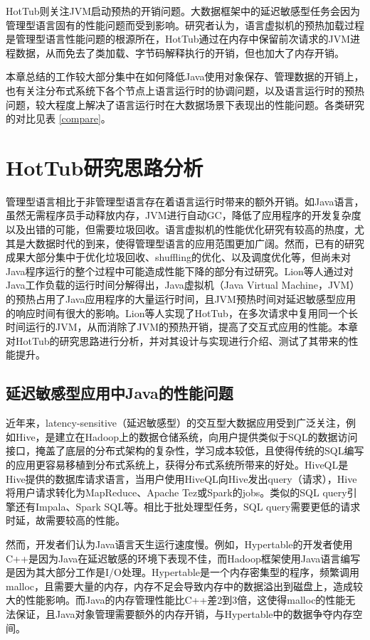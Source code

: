 \documentclass[lang=cn,12pt,a4paper,cite=authoryear]{elegantpaper}
\begin{document}

HotTub则关注JVM启动预热的开销问题。大数据框架中的延迟敏感型任务会因为管理型语言固有的性能问题而受到影响。研究者认为，语言虚拟机的预热加载过程是管理型语言性能问题的根源所在，HotTub通过在内存中保留前次请求的JVM进程数据，从而免去了类加载、字节码解释执行的开销，但也加大了内存开销。

本章总结的工作较大部分集中在如何降低Java使用对象保存、管理数据的开销上，也有关注分布式系统下各个节点上语言运行时的协调问题，以及语言运行时的预热问题，较大程度上解决了语言运行时在大数据场景下表现出的性能问题。各类研究的对比见表 \ref{compare}。

\section{HotTub研究思路分析}
管理型语言相比于非管理型语言存在着语言运行时带来的额外开销。如Java语言，虽然无需程序员手动释放内存，JVM进行自动GC，降低了应用程序的开发复杂度以及出错的可能，但需要垃圾回收。语言虚拟机的性能优化研究有较高的热度，尤其是大数据时代的到来，使得管理型语言的应用范围更加广阔。然而，已有的研究成果大部分集中于优化垃圾回收、shuffling的优化、以及调度优化等，但尚未对Java程序运行的整个过程中可能造成性能下降的部分有过研究。Lion等人通过对Java工作负载的运行时间分解得出，Java虚拟机（Java Virtual Machine，JVM）的预热占用了Java应用程序的大量运行时间，且JVM预热时间对延迟敏感型应用的响应时间有很大的影响。Lion等人实现了HotTub\cite{DBLP:conf/osdi/LionCSZGY16}，在多次请求中复用同一个长时间运行的JVM，从而消除了JVM的预热开销，提高了交互式应用的性能。本章对HotTub的研究思路进行分析，并对其设计与实现进行介绍、测试了其带来的性能提升。

\subsection{延迟敏感型应用中Java的性能问题}
近年来，latency-sensitive（延迟敏感型）的交互型大数据应用受到广泛关注，例如Hive\cite{hive}，是建立在Hadoop上的数据仓储系统，向用户提供类似于SQL的数据访问接口，掩盖了底层的分布式架构的复杂性，学习成本较低，且使得传统的SQL编写的应用更容易移植到分布式系统上，获得分布式系统所带来的好处。HiveQL是Hive提供的数据库请求语言，当用户使用HiveQL向Hive发出query（请求），Hive将用户请求转化为MapReduce、Apache Tez\cite{tez}或Spark的jobs。类似的SQL query引擎还有Impala\cite{impala}、Spark SQL\cite{DBLP:conf/sigmod/ArmbrustXLHLBMK15}等。相比于批处理型任务，SQL query需要更低的请求时延，故需要较高的性能。

然而，开发者们认为Java语言天生运行速度慢。例如，Hypertable\cite{DBLP:conf/aaai/RiosJ11}的开发者使用C++是因为Java在延迟敏感的环境下表现不佳，而Hadoop框架使用Java语言编写是因为其大部分工作是I/O处理。Hypertable是一个内存密集型的程序，频繁调用malloc，且需要大量的内存，内存不足会导致内存中的数据溢出到磁盘上，造成较大的性能影响。而Java的内存管理性能比C++差2到3倍，这使得malloc的性能无法保证，且Java对象管理需要额外的内存开销，与Hypertable中的数据争夺内存空间。
\end{document}

